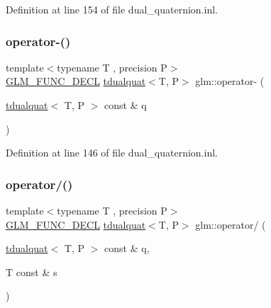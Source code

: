 Definition at line 154 of file dual\+\_\+quaternion.\+inl.

\mbox{\label{group__gtx__dual__quaternion_ga90a25279ac4f392a823e8bf6dfaddb9b}} 
\subsubsection{\texorpdfstring{operator-\/()}{operator-()}}
{\footnotesize\ttfamily template$<$typename T , precision P$>$ \\
\mbox{\hyperlink{setup_8hpp_ab2d052de21a70539923e9bcbf6e83a51}{G\+L\+M\+\_\+\+F\+U\+N\+C\+\_\+\+D\+E\+CL}} \mbox{\hyperlink{structglm_1_1tdualquat}{tdualquat}}$<$T, P$>$ glm\+::operator-\/ (\begin{DoxyParamCaption}\item[{\mbox{\hyperlink{structglm_1_1tdualquat}{tdualquat}}$<$ T, P $>$ const \&}]{q }\end{DoxyParamCaption})}



Definition at line 146 of file dual\+\_\+quaternion.\+inl.

\mbox{\label{group__gtx__dual__quaternion_gad27b1d064624dd6ff1ecc205616323ba}} 
\subsubsection{\texorpdfstring{operator/()}{operator/()}}
{\footnotesize\ttfamily template$<$typename T , precision P$>$ \\
\mbox{\hyperlink{setup_8hpp_ab2d052de21a70539923e9bcbf6e83a51}{G\+L\+M\+\_\+\+F\+U\+N\+C\+\_\+\+D\+E\+CL}} \mbox{\hyperlink{structglm_1_1tdualquat}{tdualquat}}$<$T, P$>$ glm\+::operator/ (\begin{DoxyParamCaption}\item[{\mbox{\hyperlink{structglm_1_1tdualquat}{tdualquat}}$<$ T, P $>$ const \&}]{q,  }\item[{T const \&}]{s }\end{DoxyParamCaption})}



